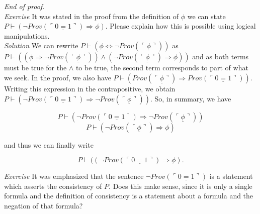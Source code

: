 \textit{End of proof}.\\

\textit{Exercise}  It was stated in the proof from the definition of $\phi$ we can state $P \vdash ( \neg Prov(\ulcorner \underline{0=1} \urcorner) \Longrightarrow \phi)$.  Please explain how this is possible using logical manipulations.\\

\textit{Solution}  We can rewrite $P \vdash (\phi \Longleftrightarrow \neg Prov(\ulcorner \underline{\phi} \urcorner))$ as $P \vdash ((\phi \Longrightarrow \neg Prov(\ulcorner \underline{\phi} \urcorner)) \land  ( \neg Prov(\ulcorner \underline{\phi} \urcorner)  \Longrightarrow \phi ))$ and as both terms must be true for the $\land$ to be true, the second term corresponds to part of what we seek.  In the proof, we also have $P \vdash (Prov(\ulcorner \underline{\phi} \urcorner) \Longrightarrow Prov(\ulcorner \underline{0=1} \urcorner))$.  Writing this expression in the contrapositive, we obtain $P \vdash (\neg Prov(\ulcorner \underline{0=1} \urcorner)  \Longrightarrow \neg Prov(\ulcorner \underline{\phi} \urcorner)  )$.  So, in summary, we have 

\begin{displaymath}
P \vdash (\neg Prov(\ulcorner \underline{0=1} \urcorner)  \Longrightarrow \neg Prov(\ulcorner \underline{\phi} \urcorner)  )  
\end{displaymath}
\begin{displaymath}
P \vdash( \neg Prov(\ulcorner \underline{\phi} \urcorner)  \Longrightarrow \phi )
\end{displaymath}

and thus we can finally write

\begin{displaymath}
P \vdash( (\neg Prov(\ulcorner \underline{0=1} \urcorner)  \Longrightarrow \phi ).
\end{displaymath}

\textit{Exercise}  It was emphasized that the sentence $\neg Prov (\ulcorner \underline{0=1} \urcorner)$ is a statement which asserts the consistency of $P$.  Does this make sense, since it is only a single formula and the definition of consistency is a statement about a formula and the negation of that formula?\\

